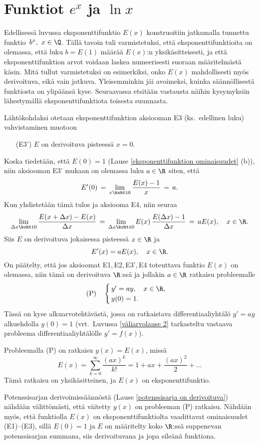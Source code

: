 \section{Funktiot $e^x$ ja $\ln x$} \label{exp(x) ja ln(x)}
\alku
{}

Edellisessä luvussa eksponenttifunktio $E(x)$ konstruoitiin jatkamalla tunnettu funktio
$\,b^x,\ x\in\Q$. Tällä tavoin tuli varmistetuksi, että eksponenttifunktioita on olemassa,
että luku $b=E(1)$ määrää $E(x)$:n yksikäsitteisesti, ja että eksponenttifunktion arvot
voidaan laskea numeerisesti suoraan määritelmästä käsin. Mitä  tullut varmistetuksi
on esimerkiksi, onko $E(x)$ mahdollisesti myös derivoituva, eikä vain jatkuva. Yleisemminkin
jäi avoimeksi, kuinka säännöllisestä funktiosta on ylipäänsä kyse. Seuraavassa etsitään
vastausta näihin kysymyksiin lähestymällä eksponenttifunktiota toisesta suunnasta.

Lähtökohdaksi otetaan eksponenttifunktion aksiooman E3 (ks.\ edellinen luku) vahvistaminen
muotoon 
\begin{itemize}
\item[(E3')]  $E$ on derivoituva pisteessä $x=0$.
\end{itemize}
Koska tiedetään, että $E(0)=1$ (Lause \ref{eksponenttifunktion ominaisuudet} (b)), niin
aksiooman E3' mukaan on olemassa luku $a\in\R$ siten, että
\[
E'(0) \,=\, \lim_{x \kohti 0} \frac{E(x)-1}{x} \,=\, a.
\]
Kun yhdistetään tämä tulos ja aksiooma E4, niin seuraa
\[
\lim_{\Delta x \kohti 0} \frac{E(x+\Delta x)-E(x)}{\Delta x}
 \,=\, \lim_{\Delta x \kohti 0} E(x)\,\frac{E(\Delta x)-1}{\Delta x} \,=\, aE(x), \quad x\in\R.
\]
Siis $E$ on derivoituva jokaisessa pisteessä $x\in\R$ ja
%
\[
E'(x)=aE(x), \quad x\in\R.
\]
On päätelty, että jos aksioomat E1,\,E2,\,E3',\,E4 toteuttava funktio $E(x)$ on
olemassa, niin tämä on derivoituva $\R$:ssä ja jollakin $a\in\R$ ratkaisu probleemalle
\[ 
\text{(P)} \quad \begin{cases} \,y'=ay, \quad x\in\R, \\ \,y(0)=1. \end{cases}
\]
Tässä on kyse alkuarvotehtävästä, jossa on ratkaistava differentiaaliyhtälö
$y'=ay$ alkuehdolla $y(0)=1$ (vrt.\ Luvussa \ref{väliarvolause 2} tarkasteltu
vastaava probleema differentiaaliyhtälölle $y'=f(x)$).
%
\begin{Lause} \label{exp-dy} Probleemalla (P) on ratkaisu $y(x)=E(x)$, missä
\[ 
E(x) = \sum_{k=0}^\infty \frac{(ax)^k}{k!} = 1 + ax + \frac{(ax)^2}{2} + \ldots 
\]
Tämä ratkaisu on yksikäsitteinen, ja $E(x)$ on eksponenttifunktio.
\end{Lause}
\tod Potenssisarjan derivoimissäännöstä (Lause \ref{potenssisarja on derivoituva}) nähdään
välittömästi, että väitetty $y(x)$ on probleeman (P) ratkaisu. Nähdään myös, että funktiolla
$E(x)$ on eksponenttifunktiolta vaadittavat ominaisuudet (E1)--(E3), sillä $E(0)=1$ ja $E$
on määritelty koko $\R$:ssä suppenevan potenssisarjan summana, siis derivoituvana ja jopa
sileänä funktiona.

